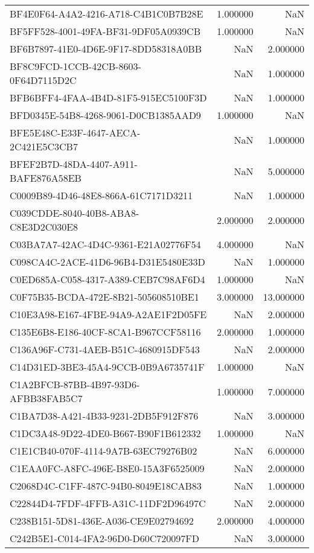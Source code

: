 \begin{tabular}{lrr}
BF4E0F64-A4A2-4216-A718-C4B1C0B7B28E & 1.000000 & NaN \\
BF5FF528-4001-49FA-BF31-9DF05A0939CB & 1.000000 & NaN \\
BF6B7897-41E0-4D6E-9F17-8DD58318A0BB & NaN & 2.000000 \\
BF8C9FCD-1CCB-42CB-8603-0F64D7115D2C & NaN & 1.000000 \\
BFB6BFF4-4FAA-4B4D-81F5-915EC5100F3D & NaN & 1.000000 \\
BFD0345E-54B8-4268-9061-D0CB1385AAD9 & 1.000000 & NaN \\
BFE5E48C-E33F-4647-AECA-2C421E5C3CB7 & NaN & 1.000000 \\
BFEF2B7D-48DA-4407-A911-BAFE876A58EB & NaN & 5.000000 \\
C0009B89-4D46-48E8-866A-61C7171D3211 & NaN & 1.000000 \\
C039CDDE-8040-40B8-ABA8-C8E3D2C030E8 & 2.000000 & 2.000000 \\
C03BA7A7-42AC-4D4C-9361-E21A02776F54 & 4.000000 & NaN \\
C098CA4C-2ACE-41D6-96B4-D31E5480E33D & NaN & 1.000000 \\
C0ED685A-C058-4317-A389-CEB7C98AF6D4 & 1.000000 & NaN \\
C0F75B35-BCDA-472E-8B21-505608510BE1 & 3.000000 & 13.000000 \\
C10E3A98-E167-4FBE-94A9-A2AE1F2D05FE & NaN & 2.000000 \\
C135E6B8-E186-40CF-8CA1-B967CCF58116 & 2.000000 & 1.000000 \\
C136A96F-C731-4AEB-B51C-4680915DF543 & NaN & 2.000000 \\
C14D31ED-3BE3-45A4-9CCB-0B9A6735741F & 1.000000 & NaN \\
C1A2BFCB-87BB-4B97-93D6-AFBB38FAB5C7 & 1.000000 & 7.000000 \\
C1BA7D38-A421-4B33-9231-2DB5F912F876 & NaN & 3.000000 \\
C1DC3A48-9D22-4DE0-B667-B90F1B612332 & 1.000000 & NaN \\
C1E1CB40-070F-4114-9A7B-63EC79276B02 & NaN & 6.000000 \\
C1EAA0FC-A8FC-496E-B8E0-15A3F6525009 & NaN & 2.000000 \\
C2068D4C-C1FF-487C-94B0-8049E18CAB83 & NaN & 1.000000 \\
C22844D4-7FDF-4FFB-A31C-11DF2D96497C & NaN & 2.000000 \\
C238B151-5D81-436E-A036-CE9E02794692 & 2.000000 & 4.000000 \\
C242B5E1-C014-4FA2-96D0-D60C720097FD & NaN & 3.000000 \\

\end{tabular}

